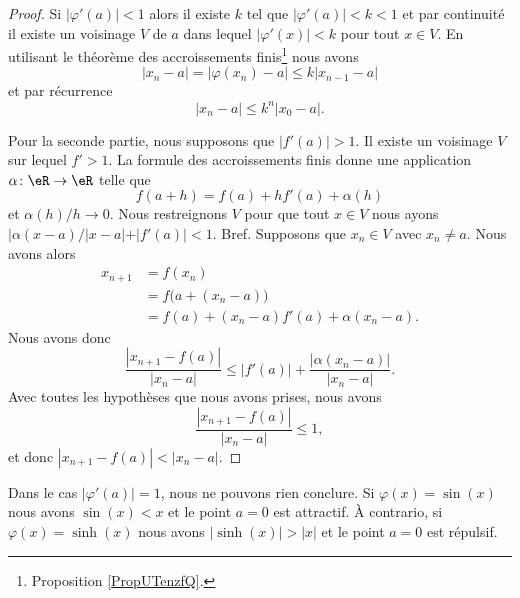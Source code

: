 \begin{proof}
	Si \( | \varphi'(a)|<1 \) alors il existe \( k\) tel que \( | \varphi'(a) |<k<1\) et par continuité il existe un voisinage \( V\) de \( a\) dans lequel \( | \varphi'(x) |<k\) pour tout \( x\in V\). En utilisant le théorème des accroissements finis\footnote{Proposition \ref{PropUTenzfQ}.} nous avons
	\begin{equation}
		| x_n-a |=\big|  \varphi(x_n)-a  \big|\leq k| x_{n-1}-a |
	\end{equation}
	et par récurrence
	\begin{equation}
		| x_n-a |\leq k^n| x_0-a |.
	\end{equation}

	Pour la seconde partie, nous supposons que \( | f'(a) |>1\). Il existe un voisinage \( V\) sur lequel \( f'>1\). La formule des accroissements finis donne une application \(  \alpha\colon \eR\to \eR  \) telle que
	\begin{equation}
		f(a+h)=f(a)+hf'(a)+\alpha(h)
	\end{equation}
	et \( \alpha(h)/h\to 0\). Nous restreignons \( V\) pour que tout \( x\in V\) nous ayons \( | \alpha(x-a)/| x-a | +| f'(a) | <1\). Bref. Supposons que \( x_n\in V\) avec \( x_n\neq a\). Nous avons alors
	\begin{subequations}
		\begin{align}
			x_{n+1} & =f(x_n)                           \\
			        & =f\big( a+(x_n-a) \big)           \\
			        & =f(a)+(x_n-a)f'(a)+\alpha(x_n-a).
		\end{align}
	\end{subequations}
	Nous avons donc
	\begin{equation}
		\frac{| x_{n+1}-f(a) |}{| x_n-a |}\leq | f'(a) |+\frac{| \alpha(x_n-a) |}{| x_n-a |}.
	\end{equation}
	Avec toutes les hypothèses que nous avons prises, nous avons
	\begin{equation}
		\frac{| x_{n+1}-f(a) |}{| x_n-a |}\leq 1,
	\end{equation}
	et donc \( | x_{n+1}-f(a) |<| x_n-a |\).
\end{proof}

\begin{remark}
	Dans le cas \(| \varphi'(a) |=1\), nous ne pouvons rien conclure. Si \( \varphi(x)=\sin(x)\) nous avons \( \sin(x)<x\) et le point \( a=0\) est attractif. À contrario, si \( \varphi(x)=\sinh(x)\) nous avons \( |\sinh(x)|>|x|\) et le point \( a=0\) est répulsif.
\end{remark}

